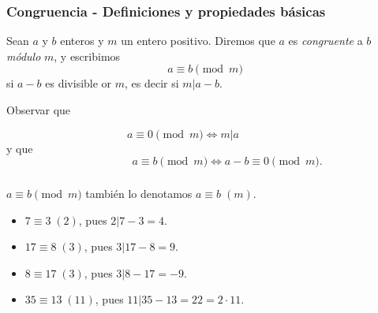 \documentclass[handout]{beamer} %
\begin{document}
    \begin{frame}
        \frametitle{Congruencia - Definiciones y propiedades básicas}
    
        \begin{definicion} Sean $a$ y $b$ enteros y $m$ un
            entero positivo. Diremos que $a$ es {\em congruente} a $b$
            {\textit{módulo}} $m$, y escribimos 
            $$
            a \equiv b \pmod{m}
            $$
            si $a-b$ es divisible or $m$,  es decir si $m| a -b$.
        \end{definicion}
        
        Observar que 
        
        $$a\equiv 0 \pmod{m} \Leftrightarrow m|a\qquad\qquad$$ 
        y que 
        $$\qquad\qquad a\equiv b \pmod{m}\Leftrightarrow a-b\equiv 0 \pmod{m}.$$ 
    \end{frame}
    
    \begin{frame}
        \frametitle{}

        \begin{notacion}
            $a \equiv b \pmod{m}$ también  lo denotamos $a \equiv b\; (m)$.

        \end{notacion}

        \begin{ejemplo}
            \begin{itemize}
                \item $7 \equiv 3 \;(2)$, pues $2 | 7-3=4$.
                \item $17 \equiv 8 \;(3)$, pues $3 | 17-8 =9$.  
                \item $8 \equiv 17 \;(3)$, pues $3 | 8-17 =-9$.
                \item $35 \equiv 13 \;(11)$, pues $11| 35-13 = 22 = 2 \cdot 11$. 
            \end{itemize}
        \end{ejemplo}
    
        
    
    \end{frame}

\end{document}
